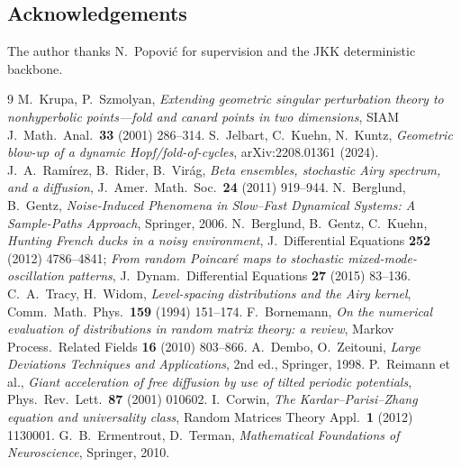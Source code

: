 \documentclass[11pt,reqno]{amsart}
\theoremstyle{plain}
\theoremstyle{definition}
\theoremstyle{remark}
\begin{document}
\subsection*{Acknowledgements}
The author thanks N.\ Popovi\'c for supervision and the JKK deterministic backbone.

\begin{thebibliography}{9}
 M.~Krupa, P.~Szmolyan, \emph{Extending geometric singular perturbation theory
to nonhyperbolic points---fold and canard points in two dimensions}, SIAM J.\ Math.\ Anal.\
\textbf{33} (2001) 286--314.
 S.~Jelbart, C.~Kuehn, N.~Kuntz, \emph{Geometric blow-up of a dynamic
Hopf/fold-of-cycles}, arXiv:2208.01361 (2024).
 J.~A.~Ram\'irez, B.~Rider, B.~Vir\'ag, \emph{Beta ensembles, stochastic Airy
spectrum, and a diffusion}, J.\ Amer.\ Math.\ Soc.\ \textbf{24} (2011) 919--944.
\bibitem{BG} N.~Berglund, B.~Gentz, \emph{Noise-Induced Phenomena in Slow--Fast Dynamical
Systems: A Sample-Paths Approach}, Springer, 2006.
 N.~Berglund, B.~Gentz, C.~Kuehn, \emph{Hunting French ducks in a noisy
environment}, J.\ Differential Equations \textbf{252} (2012) 4786--4841; \emph{From random
Poincar\'e maps to stochastic mixed-mode-oscillation patterns}, J.\ Dynam.\ Differential
Equations \textbf{27} (2015) 83--136.
 C.~A.~Tracy, H.~Widom, \emph{Level-spacing distributions and the Airy kernel},
Comm.\ Math.\ Phys.\ \textbf{159} (1994) 151--174.
 F.~Bornemann, \emph{On the numerical evaluation of distributions in
random matrix theory: a review}, Markov Process.\ Related Fields \textbf{16} (2010)
803--866.
 A.~Dembo, O.~Zeitouni, \emph{Large Deviations Techniques and Applications},
2nd ed., Springer, 1998.
 P.~Reimann et al., \emph{Giant acceleration of free diffusion by use of
tilted periodic potentials}, Phys.\ Rev.\ Lett.\ \textbf{87} (2001) 010602.
\bibitem{Corwin} I.~Corwin, \emph{The Kardar--Parisi--Zhang equation and universality
class}, Random Matrices Theory Appl.\ \textbf{1} (2012) 1130001.
\bibitem{ET} G.~B.~Ermentrout, D.~Terman, \emph{Mathematical Foundations of Neuroscience},
Springer, 2010.
\end{thebibliography}
\end{document}

